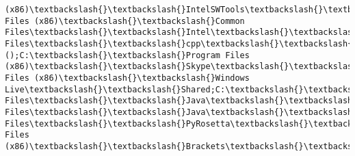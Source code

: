 \documentclass[11pt]{article}
\begin{document}
\begin{Verbatim}[commandchars=\\\{\}]
(x86)\textbackslash{}\textbackslash{}IntelSWTools\textbackslash{}\textbackslash{}compilers\_and\_libraries\_2018.0.124\textbackslash{}\textbackslash{}windows\textbackslash{}\textbackslash{}mpi\textbackslash{}\textbackslash{}intel64\textbackslash{}\textbackslash{}bin;C:\textbackslash{}\textbackslash{}ProgramData\textbackslash{}\textbackslash{}Oracle\textbackslash{}\textbackslash{}Java\textbackslash{}\textbackslash{}javapath;C:\textbackslash{}\textbackslash{}Program Files (x86)\textbackslash{}\textbackslash{}Common Files\textbackslash{}\textbackslash{}Intel\textbackslash{}\textbackslash{}Shared Files\textbackslash{}\textbackslash{}cpp\textbackslash{}\textbackslash{}bin\textbackslash{}\textbackslash{}Intel64;C:\textbackslash{}\textbackslash{}WINDOWS\textbackslash{}\textbackslash{}system32;C:\textbackslash{}\textbackslash{}WINDOWS;C:\textbackslash{}\textbackslash{}WINDOWS\textbackslash{}\textbackslash{}System32\textbackslash{}\textbackslash{}Wbem;C:\textbackslash{}\textbackslash{}WINDOWS\textbackslash{}\textbackslash{}System32\textbackslash{}\textbackslash{}WindowsPowerShell\textbackslash{}\textbackslash{}v1.0\textbackslash{}\textbackslash{};C:\textbackslash{}\textbackslash{}Users\textbackslash{}\textbackslash{}Suhardiyono\textbackslash{}\textbackslash{}Anaconda\textbackslash{}\textbackslash{}Library\textbackslash{}\textbackslash{}bin;();C:\textbackslash{}\textbackslash{}Program Files (x86)\textbackslash{}\textbackslash{}Skype\textbackslash{}\textbackslash{}Phone\textbackslash{}\textbackslash{};C:\textbackslash{}\textbackslash{}Program Files (x86)\textbackslash{}\textbackslash{}Windows Live\textbackslash{}\textbackslash{}Shared;C:\textbackslash{}\textbackslash{}Android;C:\textbackslash{}\textbackslash{}Windows\textbackslash{}\textbackslash{}System32;C:\textbackslash{}\textbackslash{}Python27;C:\textbackslash{}\textbackslash{}Python27\textbackslash{}\textbackslash{}Scripts;D:\textbackslash{}\textbackslash{}PyRosetta\textbackslash{}\textbackslash{};C:\textbackslash{}\textbackslash{}WINDOWS\textbackslash{}\textbackslash{}system32;C:\textbackslash{}\textbackslash{}WINDOWS;C:\textbackslash{}\textbackslash{}WINDOWS\textbackslash{}\textbackslash{}System32\textbackslash{}\textbackslash{}Wbem;C:\textbackslash{}\textbackslash{}WINDOWS\textbackslash{}\textbackslash{}System32\textbackslash{}\textbackslash{}WindowsPowerShell\textbackslash{}\textbackslash{}v1.0\textbackslash{}\textbackslash{};C:\textbackslash{}\textbackslash{}Program Files\textbackslash{}\textbackslash{}Java\textbackslash{}\textbackslash{}jdk8\textbackslash{}\textbackslash{}bin;C:\textbackslash{}\textbackslash{}Program Files\textbackslash{}\textbackslash{}Java\textbackslash{}\textbackslash{}jre8\textbackslash{}\textbackslash{}bin;D:\textbackslash{}\textbackslash{}MatLab\_iGEM2016\textbackslash{}\textbackslash{}bin;C:\textbackslash{}\textbackslash{}Program Files\textbackslash{}\textbackslash{}PyRosetta\textbackslash{}\textbackslash{};C:\textbackslash{}\textbackslash{}Program Files (x86)\textbackslash{}\textbackslash{}Brackets\textbackslash{}\textbackslash{}command;C:\textbackslash{}\textbackslash{}HashiCorp\textbackslash{}\textbackslash{}Vagrant\textbackslash{}\textbackslash{}bin;C:\textbackslash{}\textbackslash{}Program 
\end{Verbatim}
\end{document}
